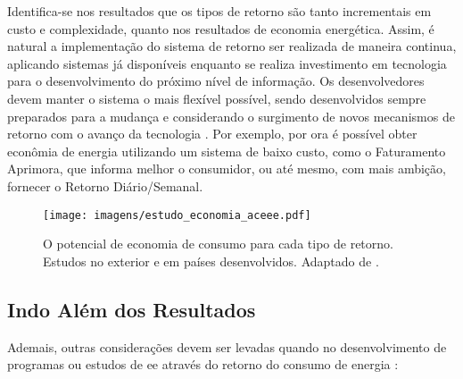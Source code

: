 Identifica-se nos resultados que os tipos de retorno são tanto incrementais
em custo e complexidade, quanto nos resultados de economia energética. Assim, 
é natural a implementação do sistema de retorno ser realizada de 
maneira continua, aplicando sistemas já disponíveis enquanto se realiza 
investimento em tecnologia para o desenvolvimento do
próximo nível de informação. Os desenvolvedores devem
manter o sistema o mais flexível possível, sendo desenvolvidos 
sempre preparados para a mudança e considerando o surgimento de novos 
mecanismos de retorno com o avanço da tecnologia 
\cite{aceee_2010_estudos_feedback}. Por exemplo, por ora é possível obter
econômia de energia utilizando um sistema de baixo custo, como o Faturamento
Aprimora, que informa melhor o consumidor, ou até mesmo, com mais ambição, 
fornecer o Retorno Diário/Semanal.

\begin{figure}[h!t]
\centering
\texttt{[image: imagens/estudo\_economia\_aceee.pdf]}
\caption[O potencial de consumo para cada tipo de retorno]
{O potencial de economia de consumo para cada tipo de retorno. Estudos
no exterior e em países desenvolvidos. Adaptado de
\cite{aceee_2010_estudos_feedback}.}
\label{fig:potencial_consumo_retorno}
\end{figure}


\subsection{Indo Além dos Resultados}
\label{ssec:ret_outros}

Ademais, outras considerações devem ser levadas quando no desenvolvimento 
de programas ou estudos de \gls{ee} através do retorno do consumo de energia
\cite{aceee_2010_estudos_feedback,2006_darby,2009_epri}:

